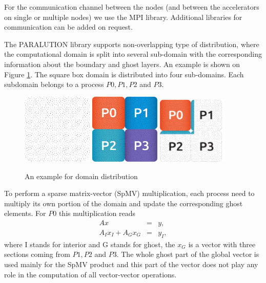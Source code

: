 For the communication channel between the nodes (and between the accelerators on single or multiple nodes) we use the MPI library. Additional libraries for communication can be added on request.

The PARALUTION library supports non-overlapping type of distribution, where the computational domain is split into several sub-domain with the corresponding information about the boundary and ghost layers. An example is shown on Figure \ref{domain-dist}. The square box domain is distributed into four sub-domains. Each subdomain belongs to a process $P0,P1,P2$ and $P3$.

\begin{figure}[!ht]
\centering
\includegraphics[width=0.3\textwidth]{./fig/domain1.pdf}
\hspace{2mm}
\includegraphics[width=0.3\textwidth]{./fig/domain2.pdf}
\hspace{2mm}
\includegraphics[width=0.3\textwidth]{./fig/domain3.pdf}
\caption{An example for domain distribution}
\label{domain-dist}
\end{figure}

To perform a sparse matrix-vector (SpMV) multiplication, each process need to multiply its own portion of the domain and update the corresponding ghost elements. For $P0$ this multiplication reads
%
\begin{eqnarray}
Ax &=& y, \\
A_{I} x_{I} + A_{G} x_{G} &=& y_{I},
\end{eqnarray}
%
where I stands for interior and G stands for ghost, the $x_{G}$ is a vector with three sections coming from $P1,P2$ and $P3$. The whole ghost part of the global vector is used mainly for the SpMV product and this part of the vector does not play any role in the computation of all vector-vector operations.

